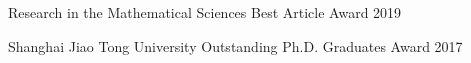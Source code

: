 

\begin{cventries}

  \cventry
  {Research in the Mathematical Sciences} %
  {Best Article Award} %
  {} %
  {2019} %
  {} %

\end{cventries}


\begin{cventries}

  \cventry
  {Shanghai Jiao Tong University} %
  {Outstanding Ph.D. Graduates Award} %
  {} %
  {2017} %
  {} %

\end{cventries}
